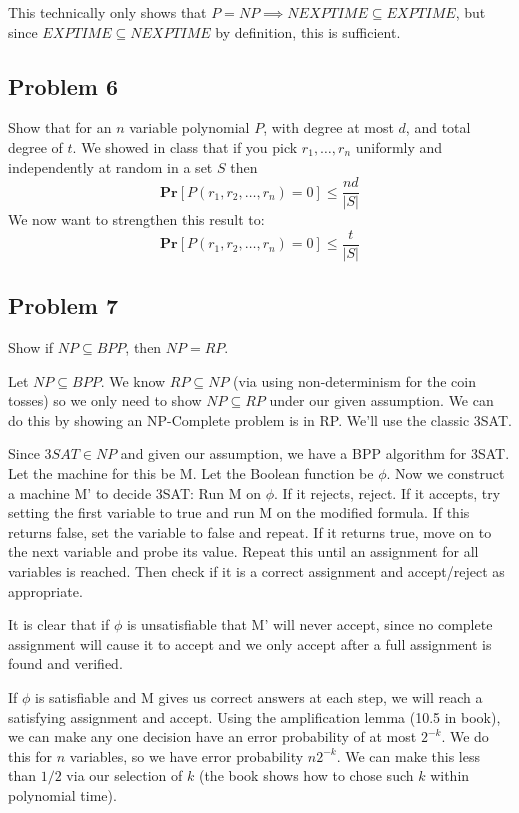 \documentclass[english]{article}
\begin{document}
This technically only shows that $P = NP \implies NEXPTIME \subseteq EXPTIME$, but since
$EXPTIME \subseteq NEXPTIME$ by definition, this is sufficient. 

\subsection*{Problem 6}
Show that for an $n$ variable polynomial $P$, with degree at most $d$, and total degree of $t$. We showed in class
that if you pick $r_1, \ldots, r_n$ uniformly and independently at random in a set $S$ then 
\[ \mathbf{Pr}[P(r_1,r_2,\ldots,r_n) = 0] \le \frac{nd}{|S|} \]
We now want to strengthen this result to:
\[ \mathbf{Pr}[P(r_1,r_2,\ldots,r_n) = 0] \le \frac{t}{|S|} \]



\subsection*{Problem 7}
Show if $NP \subseteq BPP$, then $NP = RP$.

Let $NP \subseteq BPP$. We know $RP \subseteq NP$ (via using non-determinism for the coin tosses) so we only need to show $NP \subseteq RP$ under our given assumption. We can do this by showing an NP-Complete problem is in RP. We'll use the classic 3SAT.

Since $3SAT \in NP$ and given our assumption, we have a BPP algorithm for 3SAT. Let the machine for this be M. Let the Boolean function be $\phi$. Now we construct a machine M' to decide 3SAT:
Run M on $\phi$. If it rejects, reject. If it accepts, try setting the first variable to true and run M on the modified formula. If this returns false, set the variable to false and repeat. If it returns true, move on to the next variable and probe its value. Repeat this until an assignment for all variables is reached. Then check if it is a correct assignment and accept/reject as appropriate.

It is clear that if $\phi$ is unsatisfiable that M' will never accept, since no complete assignment will cause it to accept and we only accept after a full assignment is found and verified.

If $\phi$ is satisfiable and M gives us correct answers at each step, we will reach a satisfying assignment and accept. Using the amplification lemma (10.5 in book), we can make any one decision have an error probability of at most $2^{-k}$. We do this for $n$ variables, so we have error probability $n2^{-k}$. We can make this less than $1/2$ via our selection of $k$ (the book shows how to chose such $k$ within polynomial time).
\end{document}
